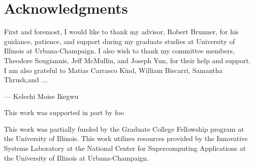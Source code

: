 \documentclass[12pt,edeposit,fullpage]{uiucthesis2014}
\begin{document}
\chapter*{Acknowledgments}

First and foremost, I would like to thank my advisor, Robert Brunner, for his guidance, patience,  and support during my graduate studies at University of Illinois at Urbana-Champaign.
I also wish to thank my committee members, Theodore Sougiannis, Jeff McMullin, and Joseph Yun, for their help and support.
I am also grateful to Matias Carrasco Kind, William Biscarri, Samantha Thrush,and ....

\begin{flushright}
--- Kelechi Moise Ikegwu
\end{flushright}

\vspace{10mm}

This work was supported in part by foo

This work was partially funded by the Graduate College Fellowship program at the University of Illinois. This work utilizes resources provided by the Innovative Systems Laboratory at the National Center for Supercomputing Applications at the University of Illinois at Urbana-Champaign.


\tableofcontents


    

%
\end{document}
